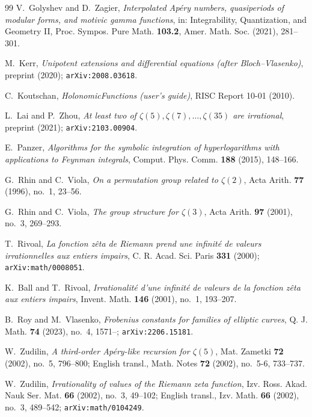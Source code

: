 \documentclass[11pt,reqno]{amsart}
\theoremstyle{plain}
\theoremstyle{definition}
\theoremstyle{remark}
\begin{document}
\begin{thebibliography}{99}
V.~Golyshev and D.~Zagier, \emph{Interpolated Ap\'ery numbers, quasiperiods of modular forms,
and motivic gamma functions}, in: Integrability, Quantization, and Geometry II,
Proc. Sympos. Pure Math. \textbf{103.2}, Amer. Math. Soc. (2021), 281--301.

M.~Kerr, \emph{Unipotent extensions and differential equations (after Bloch--Vlasenko)},
preprint (2020); \texttt{arXiv:2008.03618}.

C.~Koutschan, \emph{HolonomicFunctions (user's guide)}, RISC Report 10-01 (2010).

L.~Lai and P.~Zhou, \emph{At least two of $\zeta(5),\zeta(7),\dots,\zeta(35)$ are irrational},
preprint (2021); \texttt{arXiv:2103.00904}.

E.~Panzer, \emph{Algorithms for the symbolic integration of hyperlogarithms with applications
to Feynman integrals}, Comput. Phys. Comm. \textbf{188} (2015), 148--166.

G.~Rhin and C.~Viola, \emph{On a permutation group related to $\zeta(2)$},
Acta Arith. \textbf{77} (1996), no.~1, 23--56.

G.~Rhin and C.~Viola, \emph{The group structure for $\zeta(3)$},
Acta Arith. \textbf{97} (2001), no.~3, 269--293.

T.~Rivoal, \emph{La fonction z\^eta de Riemann prend une infinit\'e de valeurs irrationnelles
aux entiers impairs}, C. R. Acad. Sci. Paris \textbf{331} (2000);
\texttt{arXiv:math/0008051}.

K.~Ball and T.~Rivoal, \emph{Irrationalit\'e d'une infinit\'e de valeurs de la fonction z\^eta
aux entiers impairs}, Invent. Math. \textbf{146} (2001), no.~1, 193--207.

B.~Roy and M.~Vlasenko, \emph{Frobenius constants for families of elliptic curves},
Q. J. Math. \textbf{74} (2023), no.~4, 1571--; \texttt{arXiv:2206.15181}.

W.~Zudilin, \emph{A third-order Ap\'ery-like recursion for $\zeta(5)$},
Mat. Zametki \textbf{72} (2002), no.~5, 796--800;
English transl., Math. Notes \textbf{72} (2002), no.~5-6, 733--737.

W.~Zudilin, \emph{Irrationality of values of the Riemann zeta function},
Izv. Ross. Akad. Nauk Ser. Mat. \textbf{66} (2002), no.~3, 49--102;
English transl., Izv. Math. \textbf{66} (2002), no.~3, 489--542;
\texttt{arXiv:math/0104249}.


\end{thebibliography}
\end{document}
